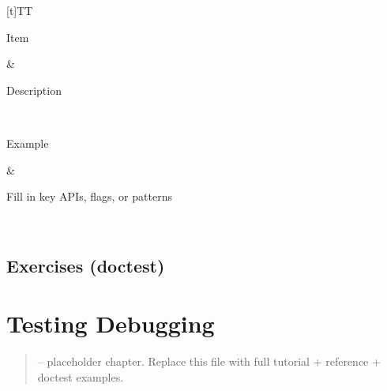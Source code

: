 \documentclass[a4paper,11pt,english]{sphinxmanual}
\begin{document}
\begin{savenotes}\sphinxattablestart
\sphinxthistablewithglobalstyle
\centering
\begin{tabulary}{\linewidth}[t]{TT}
\sphinxtoprule
\begin{varwidth}[t]{}
\sphinxstyletheadfamily \sphinxAtStartPar
Item
\sphinxbeforeendvarwidth
\end{varwidth}%
&\begin{varwidth}[t]{}
\sphinxstyletheadfamily \sphinxAtStartPar
Description
\sphinxbeforeendvarwidth
\end{varwidth}%
\\
\sphinxmidrule
\sphinxtableatstartofbodyhook\begin{varwidth}[t]{}
\sphinxAtStartPar
Example
\sphinxbeforeendvarwidth
\end{varwidth}%
&\begin{varwidth}[t]{}
\sphinxAtStartPar
Fill in key APIs, flags, or patterns
\sphinxbeforeendvarwidth
\end{varwidth}%
\\
\sphinxbottomrule
\end{tabulary}
\sphinxtableafterendhook\par
\sphinxattableend\end{savenotes}


\subsection{Exercises (doctest)}
\label{\detokenize{stdlib/serialization:exercises-doctest}}
\begin{sphinxVerbatim}[commandchars=\\\{\}]
\end{sphinxVerbatim}

\sphinxstepscope


\section{Testing Debugging}
\label{\detokenize{stdlib/testing_debugging:testing-debugging}}\label{\detokenize{stdlib/testing_debugging::doc}}\begin{quote}

\sphinxAtStartPar
{} – placeholder chapter. Replace this file with full tutorial + reference + doctest examples.
\end{quote}
\end{document}
